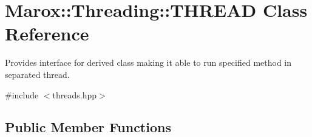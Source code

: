 \hypertarget{class_marox_1_1_threading_1_1_t_h_r_e_a_d}{}\section{Marox\+:\+:Threading\+:\+:T\+H\+R\+E\+A\+D Class Reference}
\label{class_marox_1_1_threading_1_1_t_h_r_e_a_d}


Provides interface for derived class making it able to run specified method in separated thread.  




{\ttfamily \#include $<$threads.\+hpp$>$}

\subsection*{Public Member Functions}
